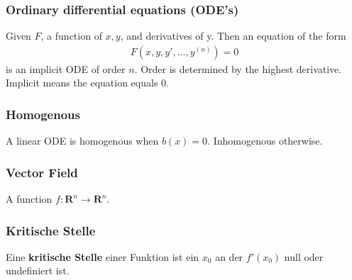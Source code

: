\documentclass[8pt]{extarticle}
\newcommand{\R}{{\mathbb R}}
\newcommand{\ra}{{\rightarrow}}
\def\R{\mathbf{R}}
\begin{document}
\begin{multicols*}{3}
  \subsubsection{Ordinary differential equations (ODE's)}
  Given $F$, a function of $x, y$, and derivatives of y.
  Then an equation of the form
  \begin{align*}
    F(x, y, y', \dots, y^{(n)}) = 0
  \end{align*}
  is an implicit ODE of order $n$. Order is determined
  by the highest derivative. Implicit means the
  equation equals $0$.

\subsubsection{Homogenous}
A linear ODE is homogenous when $b(x) = 0$.
Inhomogenous otherwise.

  \subsubsection{Vector Field}
  A function $f: \R^n \ra \R^n$.

    \subsubsection {Kritische Stelle}
  Eine \textbf{kritische Stelle} einer Funktion ist ein $x_0$ an der $f'(x_0)$ null
  oder undefiniert ist.

\end{multicols*}
\end{document}
